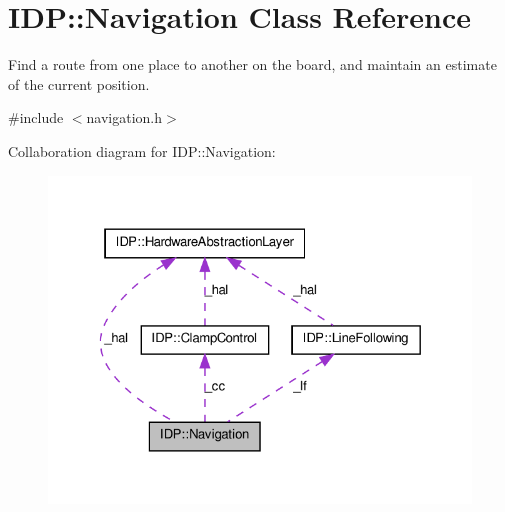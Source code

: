 \hypertarget{classIDP_1_1Navigation}{
\section{IDP::Navigation Class Reference}
\label{classIDP_1_1Navigation}
}


Find a route from one place to another on the board, and maintain an estimate of the current position.  




{\ttfamily \#include $<$navigation.h$>$}



Collaboration diagram for IDP::Navigation:\nopagebreak
\begin{figure}[H]
\begin{center}
\leavevmode
\includegraphics[width=325pt]{classIDP_1_1Navigation__coll__graph}
\end{center}
\end{figure}

